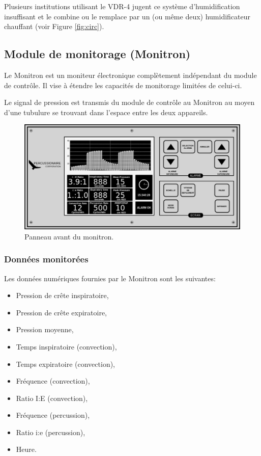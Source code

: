 Plusieurs institutions utilisant le VDR-4 jugent ce système 
d'humidification insuffisant et le combine ou le remplace par un 
(ou même deux) humidificateur chauffant (voir Figure \ref{fig:circ}).

\subsection{Module de monitorage (Monitron)}

Le Monitron est un moniteur électronique complètement indépendant du
module de contrôle. Il vise à étendre les capacités de monitorage
limitées de celui-ci.

Le signal de pression est transmis du module de contrôle au Monitron
au moyen d'une tubulure se trouvant dans l'espace entre les deux
appareils.

\begin{figure}
	\includegraphics[width=\textwidth]{img/Monitron}
	\caption{Panneau avant du monitron.}
\end{figure}

\subsubsection{Données monitorées}

Les données numériques fournies par le Monitron sont les suivantes:

\begin{itemize}
\item Pression de crête inspiratoire,
\item Pression de crête expiratoire,
\item Pression moyenne,
\item Temps inspiratoire (convection),
\item Temps expiratoire (convection),
\item Fréquence (convection),
\item Ratio I:E (convection),
\item Fréquence (percussion),
\item Ratio i:e (percussion),
\item Heure.
\end{itemize}

